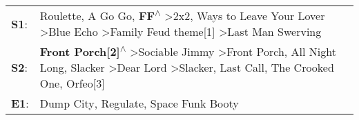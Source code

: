 \begin{supertabular}{p{0.03\textwidth}p{0.92\textwidth}}
 \textbf{S1}:  &                                                                           Roulette\textsuperscript{}, \enspace A Go Go\textsuperscript{}, \enspace \textbf{FF\textsuperscript{$\wedge$}} \textgreater \enspace 2x2\textsuperscript{},  Ways to Leave Your Lover\textsuperscript{} \textgreater \enspace Blue Echo\textsuperscript{} \textgreater \enspace Family Feud theme[1]\textsuperscript{} \textgreater \enspace Last Man Swerving\textsuperscript{}  \enspace  \\
 \textbf{S2}:  &  \textbf{Front Porch[2]\textsuperscript{$\wedge$}} \textgreater \enspace Sociable Jimmy\textsuperscript{} \textgreater \enspace Front Porch\textsuperscript{}, \enspace All Night Long\textsuperscript{}, \enspace Slacker\textsuperscript{} \textgreater \enspace Dear Lord\textsuperscript{} \textgreater \enspace Slacker\textsuperscript{}, \enspace Last Call\textsuperscript{}, \enspace The Crooked One\textsuperscript{}, \enspace Orfeo[3]\textsuperscript{}  \enspace  \\
 \textbf{E1}:  &                                                                                                                                                                                                                                                                                                                                                         Dump City\textsuperscript{}, \enspace Regulate\textsuperscript{}, \enspace Space Funk Booty\textsuperscript{}  \enspace  \\
\end{supertabular}
